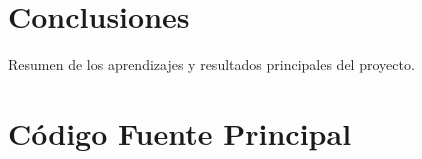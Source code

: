 \documentclass[11pt,a4paper]{article}
\begin{document}
\section{Conclusiones}
Resumen de los aprendizajes y resultados principales del proyecto.

\appendix
\section{Código Fuente Principal}
\label{app:codigo}
% 


\end{document}

